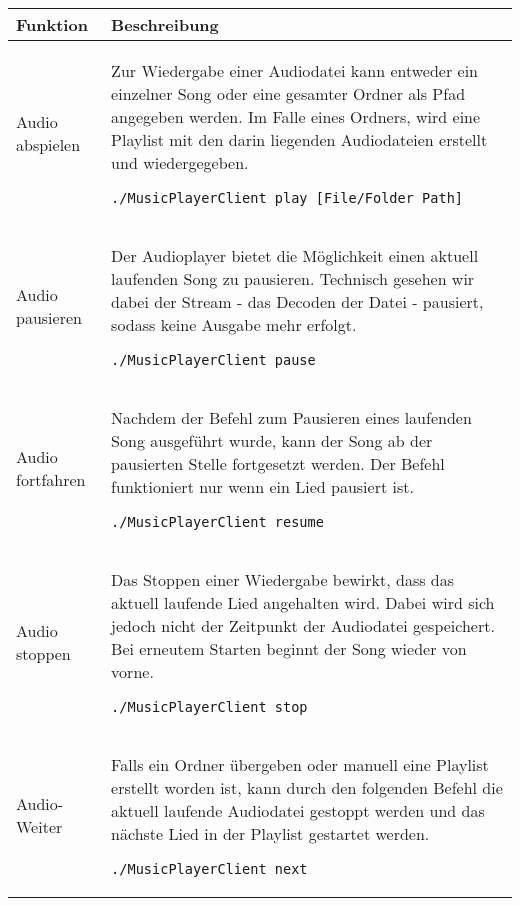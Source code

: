\begin{longtable}{l|l} 
\rowcolor{Gray}
Funktion & Beschreibung \\ \hline

Audio abspielen & \begin{minipage}[t]{.558\textwidth} Zur Wiedergabe einer Audiodatei kann entweder ein einzelner Song oder eine gesamter Ordner als Pfad angegeben werden. Im Falle eines Ordners, wird eine Playlist mit den darin liegenden Audiodateien erstellt und wiedergegeben. \begin{lstlisting}
./MusicPlayerClient play [File/Folder Path]
\end{lstlisting} \end{minipage} \\\hline

Audio pausieren & \begin{minipage}[t]{.558\textwidth} Der Audioplayer bietet die Möglichkeit einen aktuell laufenden Song zu pausieren. Technisch gesehen wir dabei der Stream - das Decoden der Datei - pausiert, sodass keine Ausgabe mehr erfolgt. \begin{lstlisting}
./MusicPlayerClient pause
\end{lstlisting} \end{minipage} \\ \hline

Audio fortfahren & \begin{minipage}[t]{.558\textwidth} Nachdem der Befehl zum Pausieren eines laufenden Song ausgeführt wurde, kann der Song ab der pausierten Stelle fortgesetzt werden. Der Befehl funktioniert nur wenn ein Lied pausiert ist. \begin{lstlisting}
./MusicPlayerClient resume
\end{lstlisting} \end{minipage} \\ \hline

Audio stoppen & \begin{minipage}[t]{.558\textwidth} Das Stoppen einer Wiedergabe bewirkt, dass das aktuell laufende Lied angehalten wird. Dabei wird sich jedoch nicht der Zeitpunkt der Audiodatei gespeichert. Bei erneutem Starten beginnt der Song wieder von vorne. \begin{lstlisting}
./MusicPlayerClient stop
\end{lstlisting} \end{minipage} \\ \hline

Audio-Weiter & \begin{minipage}[t]{.558\textwidth} Falls ein Ordner übergeben oder manuell eine Playlist erstellt worden ist, kann durch den folgenden Befehl die aktuell laufende Audiodatei gestoppt werden und das nächste Lied in der Playlist gestartet werden. \begin{lstlisting}
./MusicPlayerClient next
\end{lstlisting} \end{minipage} \\ \hline


\end{longtable}
